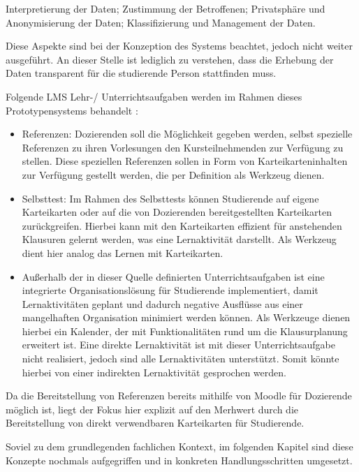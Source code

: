 	Interpretierung der Daten; Zustimmung der Betroffenen; Privatsphäre und Anonymisierung der Daten; Klassifizierung und Management der Daten.
	
Diese Aspekte sind bei der Konzeption des Systems beachtet, jedoch nicht weiter ausgeführt. An dieser Stelle ist lediglich zu verstehen, dass die Erhebung der Daten transparent für die studierende Person stattfinden muss. 
	

Folgende \ac{LMS} Lehr-/ Unterrichtsaufgaben werden im Rahmen dieses Prototypensystems behandelt \autocite[S.248]{SCHOONENBOOM2014247}:
\begin{itemize}
	\item Referenzen: Dozierenden soll die Möglichkeit gegeben werden, selbst spezielle Referenzen zu ihren Vorlesungen den Kursteilnehmenden zur Verfügung zu stellen. Diese speziellen Referenzen sollen in Form von Karteikarteninhalten zur Verfügung gestellt werden, die per Definition als Werkzeug dienen.
	\item Selbsttest: Im Rahmen des Selbsttests können Studierende auf eigene Karteikarten oder auf die von Dozierenden bereitgestellten Karteikarten zurückgreifen. Hierbei kann mit den Karteikarten effizient für anstehenden Klausuren gelernt werden, was eine Lernaktivität darstellt. Als Werkzeug dient hier analog das Lernen mit Karteikarten.
	\item Außerhalb der in dieser Quelle definierten Unterrichtsaufgaben ist eine integrierte Organisationslösung für Studierende implementiert, damit Lernaktivitäten geplant und dadurch negative Ausflüsse aus einer mangelhaften Organisation minimiert werden können.	Als Werkzeuge dienen hierbei ein Kalender, der mit Funktionalitäten rund um die Klausurplanung erweitert ist. Eine direkte Lernaktivität ist mit dieser Unterrichtsaufgabe nicht realisiert, jedoch sind alle Lernaktivitäten unterstützt. Somit könnte hierbei von einer indirekten Lernaktivität gesprochen werden.
\end{itemize}

Da die Bereitstellung von Referenzen bereits mithilfe von Moodle für Dozierende möglich ist, liegt der Fokus hier explizit auf den Merhwert durch die Bereitstellung von direkt verwendbaren Karteikarten für Studierende.

Soviel zu dem grundlegenden fachlichen Kontext, im folgenden Kapitel sind diese Konzepte nochmals aufgegriffen und in konkreten Handlungsschritten umgesetzt. 

